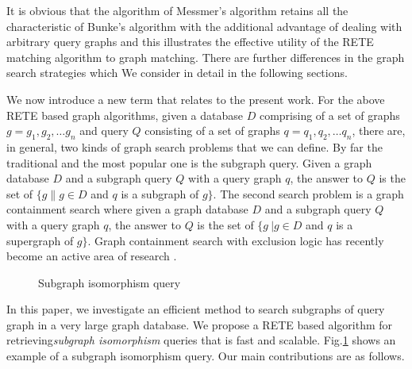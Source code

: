 It is obvious that the algorithm of Messmer's algorithm retains all the characteristic of Bunke's algorithm  with the additional advantage of dealing with arbitrary query graphs and this illustrates the effective utility of the RETE matching algorithm to graph matching. There are further differences in the graph search strategies which We consider in detail in the following sections.


We now introduce a new term that relates to the present work. For the above RETE based graph algorithms, given a database $D$ comprising of a set of graphs $g=g_{1} ,g_{2} ,\ldots g_{n}$ and query $Q$ consisting of a set of graphs $q=q_{1} ,q_{2} ,\ldots q_{n}$, there are, in general, two kinds of graph search problems that we can define. By far the traditional and the most popular one is the subgraph query. Given a graph database $D$ and a subgraph query $Q$ with  a query graph $q$, the answer to $Q$ is the set of $\{g \| g\in D$ 
and $q$ is a subgraph of $g\} $. The second search problem is a graph containment search where given a graph database $D$ and a subgraph query $Q$ with  
a query graph $q$, the answer to $Q$ is the set of $\{g\ | g\in D$ and $q$ is a supergraph of $g\}$. Graph containment search with exclusion logic has 
recently become an active area of research \cite{chen2007_cindex} \cite{zhang_gao_wu2011}.  
 

\begin{figure}
\centering

\caption{Subgraph isomorphism query}
\label{fig:fig11}
\end{figure}


In this paper, we investigate an efficient method to search subgraphs of query graph in a very large graph database. We propose a RETE based algorithm for retrieving\textit{subgraph isomorphism} queries that is fast and scalable. Fig.\ref{fig:fig11} shows an example of a subgraph isomorphism query. 
Our main contributions are as follows.

